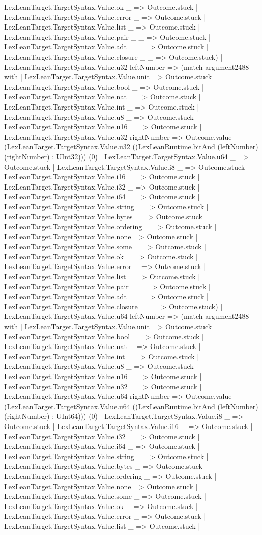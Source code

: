 \documentclass[11pt]{article}
\begin{document}
LexLeanTarget.TargetSyntax.Value.ok \_ => Outcome.stuck | LexLeanTarget.TargetSyntax.Value.error \_ => Outcome.stuck | LexLeanTarget.TargetSyntax.Value.list \_ => Outcome.stuck | LexLeanTarget.TargetSyntax.Value.pair \_ \_ => Outcome.stuck | LexLeanTarget.TargetSyntax.Value.adt \_ \_ => Outcome.stuck | LexLeanTarget.TargetSyntax.Value.closure \_ \_ => Outcome.stuck) | LexLeanTarget.TargetSyntax.Value.u32 leftNumber => (match argument2488 with | LexLeanTarget.TargetSyntax.Value.unit => Outcome.stuck | LexLeanTarget.TargetSyntax.Value.bool \_ => Outcome.stuck | LexLeanTarget.TargetSyntax.Value.nat \_ => Outcome.stuck | LexLeanTarget.TargetSyntax.Value.int \_ => Outcome.stuck | LexLeanTarget.TargetSyntax.Value.u8 \_ => Outcome.stuck | LexLeanTarget.TargetSyntax.Value.u16 \_ => Outcome.stuck | LexLeanTarget.TargetSyntax.Value.u32 rightNumber => Outcome.value (LexLeanTarget.TargetSyntax.Value.u32 ((LexLeanRuntime.bitAnd (leftNumber) (rightNumber) : UInt32))) (0) | LexLeanTarget.TargetSyntax.Value.u64 \_ => Outcome.stuck | LexLeanTarget.TargetSyntax.Value.i8 \_ => Outcome.stuck | LexLeanTarget.TargetSyntax.Value.i16 \_ => Outcome.stuck | LexLeanTarget.TargetSyntax.Value.i32 \_ => Outcome.stuck | LexLeanTarget.TargetSyntax.Value.i64 \_ => Outcome.stuck | LexLeanTarget.TargetSyntax.Value.string \_ => Outcome.stuck | LexLeanTarget.TargetSyntax.Value.bytes \_ => Outcome.stuck | LexLeanTarget.TargetSyntax.Value.ordering \_ => Outcome.stuck | LexLeanTarget.TargetSyntax.Value.none => Outcome.stuck | LexLeanTarget.TargetSyntax.Value.some \_ => Outcome.stuck | LexLeanTarget.TargetSyntax.Value.ok \_ => Outcome.stuck | LexLeanTarget.TargetSyntax.Value.error \_ => Outcome.stuck | LexLeanTarget.TargetSyntax.Value.list \_ => Outcome.stuck | LexLeanTarget.TargetSyntax.Value.pair \_ \_ => Outcome.stuck | LexLeanTarget.TargetSyntax.Value.adt \_ \_ => Outcome.stuck | LexLeanTarget.TargetSyntax.Value.closure \_ \_ => Outcome.stuck) | LexLeanTarget.TargetSyntax.Value.u64 leftNumber => (match argument2488 with | LexLeanTarget.TargetSyntax.Value.unit => Outcome.stuck | LexLeanTarget.TargetSyntax.Value.bool \_ => Outcome.stuck | LexLeanTarget.TargetSyntax.Value.nat \_ => Outcome.stuck | LexLeanTarget.TargetSyntax.Value.int \_ => Outcome.stuck | LexLeanTarget.TargetSyntax.Value.u8 \_ => Outcome.stuck | LexLeanTarget.TargetSyntax.Value.u16 \_ => Outcome.stuck | LexLeanTarget.TargetSyntax.Value.u32 \_ => Outcome.stuck | LexLeanTarget.TargetSyntax.Value.u64 rightNumber => Outcome.value (LexLeanTarget.TargetSyntax.Value.u64 ((LexLeanRuntime.bitAnd (leftNumber) (rightNumber) : UInt64))) (0) | LexLeanTarget.TargetSyntax.Value.i8 \_ => Outcome.stuck | LexLeanTarget.TargetSyntax.Value.i16 \_ => Outcome.stuck | LexLeanTarget.TargetSyntax.Value.i32 \_ => Outcome.stuck | LexLeanTarget.TargetSyntax.Value.i64 \_ => Outcome.stuck | LexLeanTarget.TargetSyntax.Value.string \_ => Outcome.stuck | LexLeanTarget.TargetSyntax.Value.bytes \_ => Outcome.stuck | LexLeanTarget.TargetSyntax.Value.ordering \_ => Outcome.stuck | LexLeanTarget.TargetSyntax.Value.none => Outcome.stuck | LexLeanTarget.TargetSyntax.Value.some \_ => Outcome.stuck | LexLeanTarget.TargetSyntax.Value.ok \_ => Outcome.stuck | LexLeanTarget.TargetSyntax.Value.error \_ => Outcome.stuck | LexLeanTarget.TargetSyntax.Value.list \_ => Outcome.stuck | 
\end{document}
